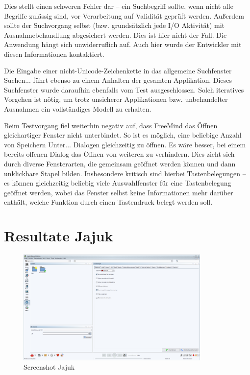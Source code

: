 Dies stellt einen schweren Fehler dar -- ein Suchbegriff sollte,
wenn nicht alle Begriffe zulässig sind, vor Verarbeitung auf
Validität geprüft werden. Außerdem sollte der Suchvorgang
selbst (bzw. grundsätzlich jede I/O Aktivität) mit Ausnahmebehandlung
abgesichert werden. Dies ist hier nicht der Fall. Die Anwendung
hängt sich unwiderruflich auf. Auch hier wurde der Entwickler
mit diesen Informationen kontaktiert.


Die Eingabe einer nicht-Unicode-Zeichenkette in das allgemeine
Suchfenster \glqq{}Suchen...\grqq{} führt ebenso zu einem
Anhalten der gesamten Applikation. Dieses Suchfenster wurde daraufhin
ebenfalls vom Test ausgeschlossen. Solch iteratives Vorgehen ist
nötig, um trotz unsicherer Applikationen bzw. unbehandelter Ausnahmen 
ein vollständiges Modell zu erhalten.

Beim Testvorgang fiel weiterhin negativ auf, dass FreeMind das Öffnen gleichartiger
Fenster nicht unterbindet. So ist es möglich, eine beliebige Anzahl von
\glqq{}Speichern Unter...\grqq{} Dialogen gleichzeitig zu öffnen. Es wäre besser, bei einem bereits
offenen Dialog das Öffnen von weiteren zu verhindern. Dies zieht sich durch
diverse Fensterarten, die gemeinsam geöffnet werden können und dann
unklickbare \glqq{}Stapel\grqq{} bilden. Insbesondere kritisch sind
hierbei Tastenbelegungen -- es können gleichzeitig beliebig viele
Auswahlfenster für eine Tastenbelegung geöffnet werden, wobei das
Fenster selbst keine Informationen mehr darüber enthält, welche Funktion
durch einen Tastendruck belegt werden soll.


\section{Resultate Jajuk}\label{section:testresultsyed}

\begin{figure}
	\centering
	\includegraphics[width=0.85\textwidth]{bilder/screenshot_jajuk.png}
	\caption{Screenshot Jajuk}
\end{figure}

